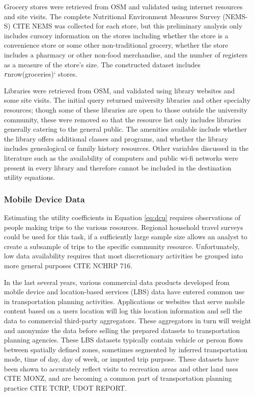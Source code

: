 \documentclass[3p, authoryear]{elsarticle} %
\begin{document}
Grocery stores were retrieved from OSM and validated using internet resources and
site visits. The complete Nutritional Environment Measures Survey (NEMS-S) CITE NEMS
was collected for each store, but this preliminary analysis only includes
cursory information on the stores including whether the store is a convenience store
or some other non-traditional grocery, whether the store includes a pharmacy or
other non-food merchandise, and the number of registers as a measure of the
store's size. The constructed dataset includes \texttt{r}nrow(groceries)` stores.

Libraries were retrieved from OSM, and validated using library websites and
some site visits. The initial query returned university libraries and other
specialty resources; though some of these libraries are open to those outside
the university community, these were removed so that the resource list only
includes libraries generally catering to the general public. The amenities
available include whether the library offers additional classes and programs,
and whether the library includes genealogical or family history resources.
Other variables discussed in the literature such as the availability of computers
and public wi-fi networks were present in every library and therefore cannot
be included in the destination utility equations.

\hypertarget{mobile-device-data}{%
\subsubsection{Mobile Device Data}\label{mobile-device-data}}

Estimating the utility coefficients in Equation \eqref{eq:dcu} requires
observations of people making trips to the various resources. Regional household
travel surveys could be used for this task, if a sufficiently large sample size
allows an analyst to create a subsample of trips to the specific community resource.
Unfortunately, low data availability requires that most discretionary activities
be grouped into more general purposes CITE NCHRP 716.

In the last several years, various commercial data products developed from
mobile device and location-based services (LBS) data have entered common use in
transportation planning activities. Applications or websites that serve mobile
content based on a users location will log this location information and
sell the data to commercial third-party aggregators. These aggregators in turn will weight
and anonymize the data before selling the prepared datasets to transportation
planning agencies. These LBS datasets typically contain
vehicle or person flows between spatially defined zones, sometimes segmented by
inferred transportation mode, time of day, day of week, or imputed trip purpose.
These datasets have been shown to accurately reflect visits to recreation areas
and other land uses CITE MONZ, and are becoming a common part of transportation
planning practice CITE TCRP, UDOT REPORT.
\end{document}
